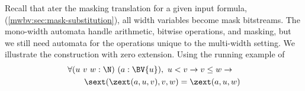 % 
% 
% 
% 
% 
% 

Recall that ater the masking translation for a given input formula, (\cref{mwbv:sec:mask-substitution}), all width variables
become mask bitstreams.
The mono-width automata handle arithmetic, bitwise operations, and masking,
but we still need automata for the operations unique to the multi-width setting.
We illustrate the construction with zero extension.
Using the running example of
\[
\begin{aligned}
  &\forall (u~v~w : \N)~(a : \BV{u}),~ u < v \to v \leq w \to\\
  &\qquad \sext(\zext(a, u, v), v, w) = \zext(a, u, w)
\end{aligned}
\]

